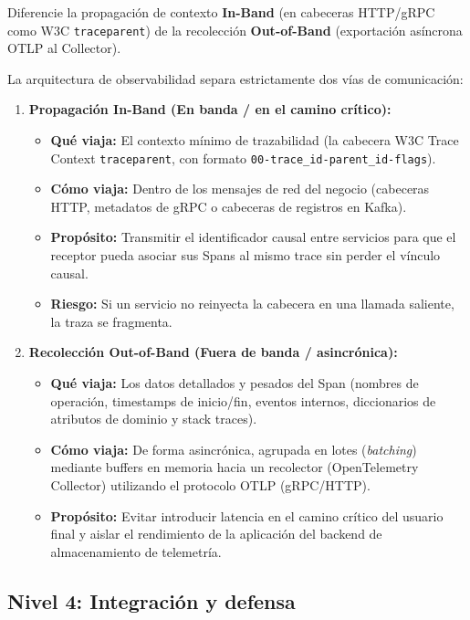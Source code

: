 \documentclass[variant=guia,cover=institutional,mode=screen]{ua-engineering-v6-article}
\begin{document}
\begin{uaexercise}
Diferencie la propagación de contexto \textbf{In-Band} (en cabeceras HTTP/gRPC como W3C \texttt{traceparent}) de la recolección \textbf{Out-of-Band} (exportación asíncrona OTLP al Collector).
\end{uaexercise}
\begin{uaanswer}
La arquitectura de observabilidad separa estrictamente dos vías de comunicación:
\begin{enumerate}
\item \textbf{Propagación In-Band (En banda / en el camino crítico):}
\begin{itemize}
\item \textbf{Qué viaja:} El contexto mínimo de trazabilidad (la cabecera W3C Trace Context \texttt{traceparent}, con formato \texttt{00-trace\_id-parent\_id-flags}).
\item \textbf{Cómo viaja:} Dentro de los mensajes de red del negocio (cabeceras HTTP, metadatos de gRPC o cabeceras de registros en Kafka).
\item \textbf{Propósito:} Transmitir el identificador causal entre servicios para que el receptor pueda asociar sus Spans al mismo trace sin perder el vínculo causal.
\item \textbf{Riesgo:} Si un servicio no reinyecta la cabecera en una llamada saliente, la traza se fragmenta.
\end{itemize}

\item \textbf{Recolección Out-of-Band (Fuera de banda / asincrónica):}
\begin{itemize}
\item \textbf{Qué viaja:} Los datos detallados y pesados del Span (nombres de operación, timestamps de inicio/fin, eventos internos, diccionarios de atributos de dominio y stack traces).
\item \textbf{Cómo viaja:} De forma asincrónica, agrupada en lotes (\emph{batching}) mediante buffers en memoria hacia un recolector (OpenTelemetry Collector) utilizando el protocolo OTLP (gRPC/HTTP).
\item \textbf{Propósito:} Evitar introducir latencia en el camino crítico del usuario final y aislar el rendimiento de la aplicación del backend de almacenamiento de telemetría.
\end{itemize}
\end{enumerate}
\end{uaanswer}


\subsection*{Nivel 4: Integración y defensa}
\end{document}
